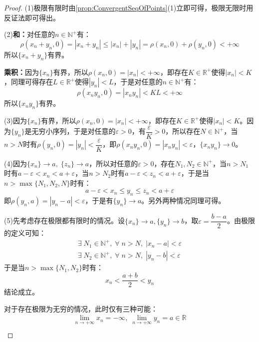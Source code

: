 \begin{proof}
	(1)极限有限时由\cref{prop:ConvergentSeqOfPoints}(1)立即可得，极限无限时用反证法即可得出。\par
	(2)\textbf{和：}对任意的$n\in\mathbb{N}^+$有：
	\begin{equation*}
		\rho(x_n+y_n,0)=|x_n+y_n|\leqslant|x_n|+|y_n|=\rho(x_n,0)+\rho(y_n,0)<+\infty
	\end{equation*}
	所以$\{x_n+y_n\}$有界。\par
	\textbf{乘积：}因为$\{x_n\}$有界，所以$\rho(x_n,0)=|x_n|<+\infty$，即存在$K\in\mathbb{R}^{+}$使得$|x_n|<K$，同理可得存在$L\in\mathbb{R}^{+}$使得$|y_n|<L$，于是对任意的$n\in\mathbb{N}^+$有：
	\begin{equation*}
		\rho(x_ny_n,0)=|x_ny_n|<KL<+\infty
	\end{equation*}
	所以$\{x_ny_n\}$有界。\par
	(3)因为$\{x_n\}$有界，所以$\rho(x_n,0)=|x_n|<+\infty$，即存在$K\in\mathbb{R}^{+}$使得$|x_n|<K$。因为$\{y_n\}$是无穷小序列，于是对任意的$\varepsilon>0$，有$\dfrac{\varepsilon}{K}>0$，所以存在$N\in\mathbb{N}^+$，当$n>N$时有$\rho(y_n,0)=|y_n|<\dfrac{\varepsilon}{K}$，即$\rho(x_ny_n,0)=|x_ny_n|<\varepsilon$，$\{x_ny_n\}\to0$。\par
	(4)因为$\{x_n\}\to a,\;\{z_n\}\to a$，所以对任意的$\varepsilon>0$，存在$N_1,N_2\in\mathbb{N}^+$，当$n>N_1$时有$a-\varepsilon<x_n<a+\varepsilon$，当$n>N_2$时有$a-\varepsilon<z_n<a+\varepsilon$，于是当$n>\max\{N_1,N_2,N\}$时有：
	\begin{equation*}
		a-\varepsilon<x_n\leqslant y_n\leqslant z_n<a+\varepsilon
	\end{equation*}
	即$\rho(y_n,a)=|y_n-a|<\varepsilon$，于是有$\{y_n\}\to a$。另外两种情况同理可得。\par
	(5)先考虑存在极限都有限时的情况。设$\{x_n\}\to a,\{y_n\}\to b$，取$\varepsilon=\dfrac{b-a}{2}$。由极限的定义可知：
	\begin{gather*}
		\exists\;N_1\in\mathbb{N}^+,\;\forall\;n>N,\;|x_n-a|<\varepsilon \\
		\exists\;N_2\in\mathbb{N}^+,\;\forall\;n>N,\;|y_n-b|<\varepsilon
	\end{gather*}
	于是当$n>\max\{N_1,N_2\}$时有：
	\begin{equation*}
		x_n<\frac{a+b}{2}<y_n
	\end{equation*}
	结论成立。\par
	对于存在极限为无穷的情况，此时仅有三种可能：
	\begin{gather*}
		\lim_{n\to+\infty}x_n=-\infty,\;\lim_{n\to+\infty}y_n=a\in\mathbb{R} \\

\end{gather*}
\end{proof}
